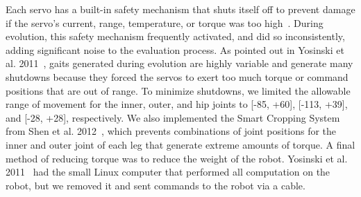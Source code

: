 Each servo has a built-in safety mechanism that shuts itself off to prevent damage if the servo's current, range, temperature, or torque was too high~\cite{robotis}. During evolution, this safety mechanism frequently activated, and did so inconsistently, adding significant noise to the evaluation process. As pointed out in Yosinski et al. 2011~\cite{yos:clune}, gaits generated during evolution are highly variable and generate many shutdowns because they forced the servos to exert too much torque or command positions that are out of range. %
To minimize shutdowns, we limited the allowable range of movement for the inner, outer, and hip joints to [-85\degree, +60\degree], [-113\degree, +39\degree], and [-28\degree, +28\degree], respectively. We also implemented the Smart Cropping System from Shen et al. 2012~\cite{haocheng}, which prevents combinations of joint positions for the inner and outer joint of each leg that generate extreme amounts of torque. A final method of reducing torque was to reduce the weight of the robot. Yosinski et al. 2011~\cite{yos:clune} had the small Linux computer that performed all computation on the robot, but we removed it and sent commands to the robot via a cable. 
